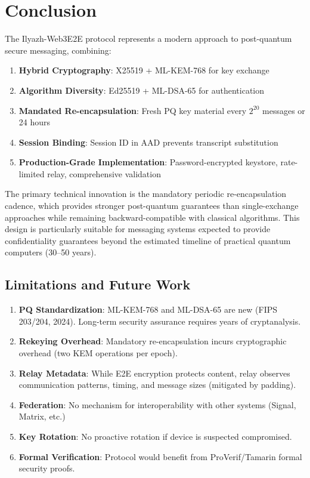 \documentclass[11pt,a4paper,oneside]{article}
\begin{document}
\section{Conclusion}

The Ilyazh-Web3E2E protocol represents a modern approach to post-quantum secure messaging, combining:

\begin{enumerate}
\item \textbf{Hybrid Cryptography}: X25519 + ML-KEM-768 for key exchange
\item \textbf{Algorithm Diversity}: Ed25519 + ML-DSA-65 for authentication
\item \textbf{Mandated Re-encapsulation}: Fresh PQ key material every $2^{20}$ messages or 24 hours
\item \textbf{Session Binding}: Session ID in AAD prevents transcript substitution
\item \textbf{Production-Grade Implementation}: Password-encrypted keystore, rate-limited relay, comprehensive validation
\end{enumerate}

The primary technical innovation is the mandatory periodic re-encapsulation cadence, which provides stronger post-quantum guarantees than single-exchange approaches while remaining backward-compatible with classical algorithms. This design is particularly suitable for messaging systems expected to provide confidentiality guarantees beyond the estimated timeline of practical quantum computers (30--50 years).

\subsection{Limitations and Future Work}

\begin{enumerate}
\item \textbf{PQ Standardization}: ML-KEM-768 and ML-DSA-65 are new (FIPS 203/204, 2024). Long-term security assurance requires years of cryptanalysis.

\item \textbf{Rekeying Overhead}: Mandatory re-encapsulation incurs cryptographic overhead (two KEM operations per epoch).

\item \textbf{Relay Metadata}: While E2E encryption protects content, relay observes communication patterns, timing, and message sizes (mitigated by padding).

\item \textbf{Federation}: No mechanism for interoperability with other systems (Signal, Matrix, etc.)

\item \textbf{Key Rotation}: No proactive rotation if device is suspected compromised.

\item \textbf{Formal Verification}: Protocol would benefit from ProVerif/Tamarin formal security proofs.
\end{enumerate}
\end{document}
